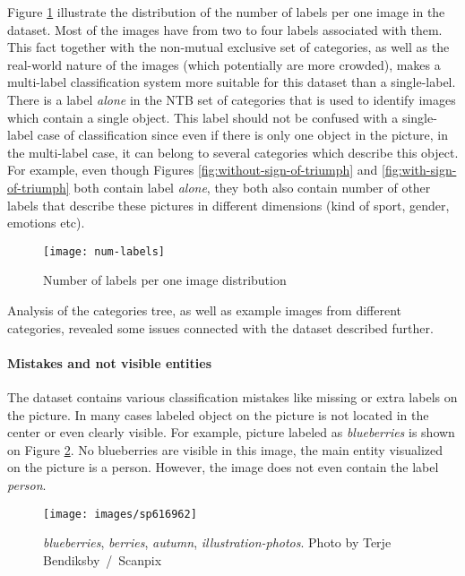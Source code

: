 Figure \ref{fig:num-labels} illustrate the distribution of the number of labels per one image in the dataset. Most of the images have from two to four labels associated with them. This fact together with the non-mutual exclusive set of categories, as well as the real-world nature of the images (which potentially are more crowded), makes a multi-label classification system more suitable for this dataset than a single-label. There is a label \textit{alone} in the NTB set of categories that is used to identify images which contain a single object. This label should not be confused with a single-label case of classification since even if there is only one object in the picture, in the multi-label case, it can belong to several categories which describe this object. For example, even though Figures \ref{fig:without-sign-of-triumph} and \ref{fig:with-sign-of-triumph} both contain label \textit{alone}, they both also contain number of other labels that describe these pictures in different dimensions (kind of sport, gender, emotions etc).

\begin{figure}[H]
    \centering
    \texttt{[image: num-labels]}
    \caption{Number of labels per one image distribution}
    \label{fig:num-labels}
\end{figure}

Analysis of the categories tree, as well as example images from different categories, revealed some issues connected with the dataset described further.

\paragraph{Mistakes and not visible entities}
The dataset contains various classification mistakes like missing or extra labels on the picture. In many cases labeled object on the picture is not located in the center or even clearly visible. For example, picture labeled as \textit{blueberries} is shown on Figure \ref{fig:image-blueberries}. No blueberries are visible in this image, the main entity visualized on the picture is a person. However, the image does not even contain the label \textit{person}. 

\begin{figure}[H]
    \centering
    \texttt{[image: images/sp616962]}
    \caption[Example picture from the \textit{blueberries} category]{\textit{blueberries}, \textit{berries}, \textit{autumn}, \textit{illustration-photos}. Photo by Terje Bendiksby~/~Scanpix}
    \label{fig:image-blueberries}
\end{figure}

